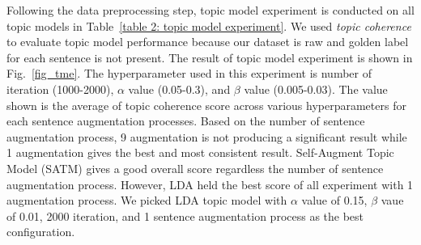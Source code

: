 \documentclass[10pt, conference, compsocconf]{IEEEtran}
\begin{document}
\begin{table}[b]
\caption{Dataset Property}
\label{table 4: dataset property}
\end{table}

Following the data preprocessing step, topic model experiment is conducted on all topic models in Table~\ref{table 2: topic model experiment}. We used {\it topic coherence} to evaluate topic model performance because our dataset is raw and golden label for each sentence is not present\cite{b6}. The result of topic model experiment is shown in Fig.~\ref{fig_tme}.  The hyperparameter used in this experiment is number of iteration (1000-2000),  $\alpha$ value (0.05-0.3), and  $\beta$ value (0.005-0.03). The value shown is the average of topic coherence score across various hyperparameters for each sentence augmentation processes. Based on the number of sentence augmentation process, 9 augmentation is not producing a significant result while 1 augmentation gives the best and most consistent result. Self-Augment Topic Model (SATM) gives a good overall score regardless the number of sentence augmentation process. However, LDA held the best score of all experiment with 1 augmentation process. We picked LDA topic model with $\alpha$ value of 0.15, $\beta$ vaue of 0.01, 2000 iteration, and 1 sentence augmentation process as the best configuration.
\end{document}
